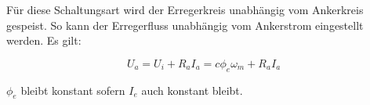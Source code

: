 F\"ur diese  Schaltungsart  wird  der Erregerkreis unabh\"angig vom Ankerkreis
gespeist. So  kann  der  Erregerfluss  unabh\"angig vom Ankerstrom eingestellt
werden. Es gilt:

\begin{equation}
    U_a = U_i + R_aI_a = c\phi_e\omega_m + R_aI_a
\end{equation}

$\phi_e$ bleibt konstant sofern $I_e$ auch konstant bleibt.


